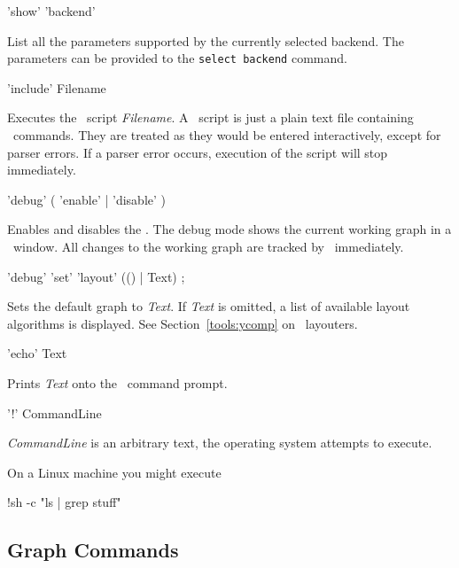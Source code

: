 \begin{rail}
  'show' 'backend'
\end{rail}\nopagebreak{}
List all the parameters supported by the currently selected backend. The parameters can be provided to the \texttt{select backend} command.

\begin{rail}
  'include' Filename
\end{rail}
Executes the \GrShell\ script \emph{Filename}. A \GrShell\ script is just a plain text file containing \GrShell\ commands. They are treated as they would be entered interactively, except for parser errors. If a parser error occurs, execution of the script will stop immediately.

\begin{rail}
  'debug' ( 'enable' | 'disable' )
\end{rail}
Enables and disables the . The debug mode shows the current working graph in a \yComp\ window. All changes to the working graph are tracked by \yComp\ immediately.  

\begin{rail}
  'debug' 'set' 'layout' (() | Text) ;
\end{rail}
Sets the default graph  to \emph{Text}. If \emph{Text} is omitted, a list of available layout algorithms is displayed. See Section~\ref{tools:ycomp} on \yComp\ layouters.

\begin{rail}
  'echo' Text
\end{rail}
Prints \emph{Text} onto the \GrShell\ command prompt.

\begin{rail}
  '!' CommandLine
\end{rail}
\emph{CommandLine} is an arbitrary text, the operating system attempts to execute.
\begin{example}
On a Linux machine you might execute
\begin{grshell}
!sh -c "ls | grep stuff"
\end{grshell}
\end{example}

\subsection{Graph Commands}
\label{graphcommands}

